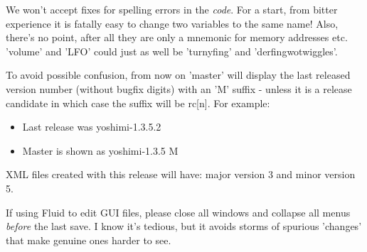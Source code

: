    We won't accept fixes for spelling errors in the \textsl{code}.
   For a start, from bitter experience it is fatally easy to change two
   variables to the same name! Also, there's no point, after all they are only
   a mnemonic for memory addresses etc. 'volume' and 'LFO' could just as well
   be 'turnyfing' and 'derfingwotwiggles'.

   To avoid possible confusion, from now on 'master' will display the last
   released version number (without bugfix digits) with an 'M' suffix - unless
   it is a release candidate in which case the suffix will be rc[n].
   For example:

   \begin{itemize}
      \item Last release was yoshimi-1.3.5.2
      \item Master is shown as yoshimi-1.3.5 M
   \end{itemize}

   XML files created with this release will have: 
   major version 3 and minor version 5.

   If using Fluid to edit GUI files, please close all windows and collapse all
   menus \textsl{before} the last save.  I know it's tedious, but it avoids
   storms of spurious 'changes' that make genuine ones harder to see.

